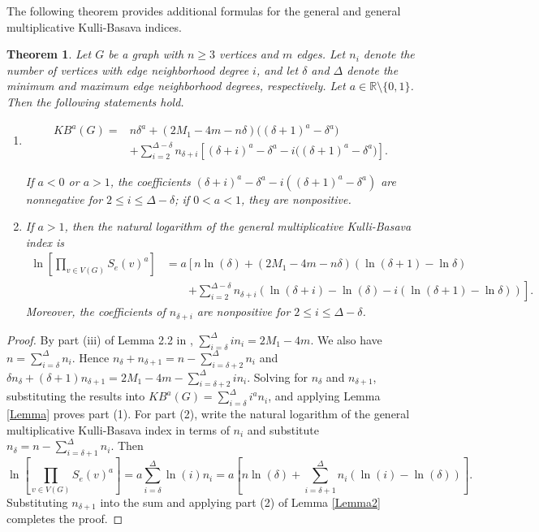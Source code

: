 \documentclass[10pt,a4paper]{amsart}
\newtheorem{theorem}{Theorem}[section]
\numberwithin{equation}{section}
\begin{document}
The following theorem provides additional formulas for the general and general multiplicative Kulli-Basava indices.


\begin{theorem}\label{Theorem2}
Let $G$ be a graph with $n\geq 3$ vertices and $m$ edges. Let $n_i$ denote the number of vertices with edge neighborhood degree $i$, and let $\delta$ and $\Delta$ denote the minimum and maximum edge neighborhood degrees, respectively. Let $a\in\mathbb{R}\setminus\{0,1\}$. Then the following statements hold.
 \begin{enumerate}
 \item
\begin{align*}
KB^a(G)={}&n\delta^a+(2M_1-4m-n\delta)\bigl((\delta+1)^a-\delta^a\bigr)\\
&+\sum_{i=2}^{\Delta-\delta}n_{\delta+i}
\left[(\delta+i)^a-\delta^a-i\bigl((\delta+1)^a-\delta^a\bigr)\right].
\end{align*}
   
If $a<0$ or $a>1$, the coefficients $(\delta+i)^a-\delta^a-i((\delta+1)^a-\delta^a)$ are nonnegative for $2\leq i\leq\Delta-\delta$; if $0<a<1$, they are nonpositive.

\item If $a>1$, then the natural logarithm of the general multiplicative Kulli-Basava index is
\[
\begin{aligned}
\ln\left[\prod_{v\in V(G)}S_e(v)^a\right]
&=a\left[n\ln(\delta)+(2M_1-4m-n\delta)(\ln(\delta+1)-\ln\delta)\right.\\
&\qquad\left.+\sum_{i=2}^{\Delta-\delta}n_{\delta+i}\left(\ln(\delta+i)-\ln(\delta)-i(\ln(\delta+1)-\ln\delta)\right)\right].
\end{aligned}
\]
Moreover, the coefficients of $n_{\delta+i}$ are nonpositive for $2\leq i\leq\Delta-\delta$.
\end{enumerate} 
 
\end{theorem}

\begin{proof}

By part (iii) of Lemma 2.2 in \cite{basavanagoud2019kulli}, $\sum_{i=\delta}^\Delta i n_i=2M_1-4m$. We also have $n=\sum_{i=\delta}^\Delta n_i$. Hence $n_\delta+n_{\delta+1}=n-\sum_{i=\delta+2}^\Delta n_i$ and $\delta n_\delta+(\delta+1)n_{\delta+1}=2M_1-4m-\sum_{i=\delta+2}^\Delta i n_i$. Solving for $n_\delta$ and $n_{\delta+1}$, substituting the results into $KB^a(G)=\sum_{i=\delta}^\Delta i^a n_i$, and applying Lemma \ref{Lemma} proves part (1). For part (2), write the natural logarithm of the general multiplicative Kulli-Basava index in terms of $n_i$ and substitute $n_\delta=n-\sum_{i=\delta+1}^\Delta n_i$. Then
\[
\ln\left[\prod_{v\in V(G)}S_e(v)^a\right]=a\sum_{i=\delta}^\Delta\ln(i)n_i=a\left[n\ln(\delta)+\sum_{i=\delta+1}^\Delta n_i(\ln(i)-\ln(\delta))\right].
\]
Substituting $n_{\delta+1}$ into the sum and applying part (2) of Lemma \ref{Lemma2} completes the proof.

\end{proof}
\end{document}

